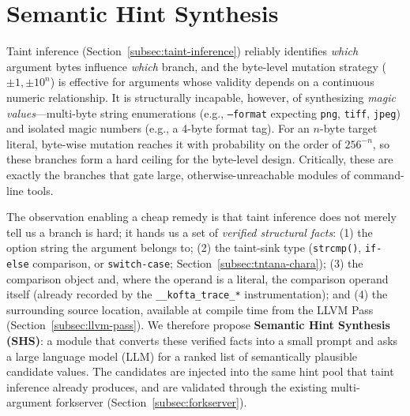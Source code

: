 \providecommand{\KOFTA}{KOFTA}
\providecommand{\KSHS}{KOFTA+SHS}
\providecommand{\KSHSng}{KOFTA+SHS\textbackslash g}
\providecommand{\LLMonly}{LLM-only}
\providecommand{\Weifuzz}{Wei-fuzz}
\providecommand{\Atwelve}{$\hat{A}_{12}$}

\section{Semantic Hint Synthesis}
\label{sec:shs}

Taint inference (Section~\ref{subsec:taint-inference}) reliably identifies \emph{which} argument bytes influence \emph{which} branch, and the byte-level mutation strategy ($\pm 1, \pm 10^{n}$) is effective for arguments whose validity depends on a continuous numeric relationship. It is structurally incapable, however, of synthesizing \emph{magic values}---multi-byte string enumerations (e.g., \texttt{--format} expecting \texttt{png}, \texttt{tiff}, \texttt{jpeg}) and isolated magic numbers (e.g., a 4-byte format tag). For an $n$-byte target literal, byte-wise mutation reaches it with probability on the order of $256^{-n}$, so these branches form a hard ceiling for the byte-level design. Critically, these are exactly the branches that gate large, otherwise-unreachable modules of command-line tools.

The observation enabling a cheap remedy is that taint inference does not merely tell us a branch is hard; it hands us a set of \emph{verified structural facts}: (1) the option string the argument belongs to; (2) the taint-sink type (\texttt{strcmp()}, \texttt{if-else} comparison, or \texttt{switch-case}; Section~\ref{subsec:tntana-chara}); (3) the comparison object and, where the operand is a literal, the comparison operand itself (already recorded by the \texttt{\_\_kofta\_trace\_*} instrumentation); and (4) the surrounding source location, available at compile time from the LLVM Pass (Section~\ref{subsec:llvm-pass}). We therefore propose \textbf{Semantic Hint Synthesis (SHS)}: a module that converts these verified facts into a small prompt and asks a large language model (LLM) for a ranked list of semantically plausible candidate values. The candidates are injected into the same hint pool that taint inference already produces, and are validated through the existing multi-argument forkserver (Section~\ref{subsec:forkserver}).

